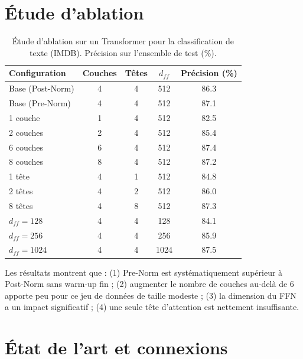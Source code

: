 \section{\'Etude d'ablation}
\label{sec:transformer-ablation}

\begin{table}[htbp]
\centering
\caption{\'Etude d'ablation sur un Transformer pour la classification de texte (IMDB). Pr\'ecision sur l'ensemble de test (\%).}
\label{tab:transformer-ablation}
\begin{tabular}{lcccc}
\toprule
\textbf{Configuration} & \textbf{Couches} & \textbf{T\^etes} & \textbf{$d_{ff}$} & \textbf{Pr\'ecision (\%)} \\
\midrule
Base (Post-Norm) & 4 & 4 & 512 & 86.3 \\
Base (Pre-Norm) & 4 & 4 & 512 & 87.1 \\
\midrule
1 couche & 1 & 4 & 512 & 82.5 \\
2 couches & 2 & 4 & 512 & 85.4 \\
6 couches & 6 & 4 & 512 & 87.4 \\
8 couches & 8 & 4 & 512 & 87.2 \\
\midrule
1 t\^ete & 4 & 1 & 512 & 84.8 \\
2 t\^etes & 4 & 2 & 512 & 86.0 \\
8 t\^etes & 4 & 8 & 512 & 87.3 \\
\midrule
$d_{ff}=128$ & 4 & 4 & 128 & 84.1 \\
$d_{ff}=256$ & 4 & 4 & 256 & 85.9 \\
$d_{ff}=1024$ & 4 & 4 & 1024 & 87.5 \\
\bottomrule
\end{tabular}
\end{table}

\begin{remarque}
Les r\'esultats montrent que : (1) Pre-Norm est syst\'ematiquement sup\'erieur \`a Post-Norm sans warm-up fin ; (2) augmenter le nombre de couches au-del\`a de 6 apporte peu pour ce jeu de donn\'ees de taille modeste ; (3) la dimension du FFN a un impact significatif ; (4) une seule t\^ete d'attention est nettement insuffisante.
\end{remarque}

\section{\'Etat de l'art et connexions}
\label{sec:transformers-sota}

